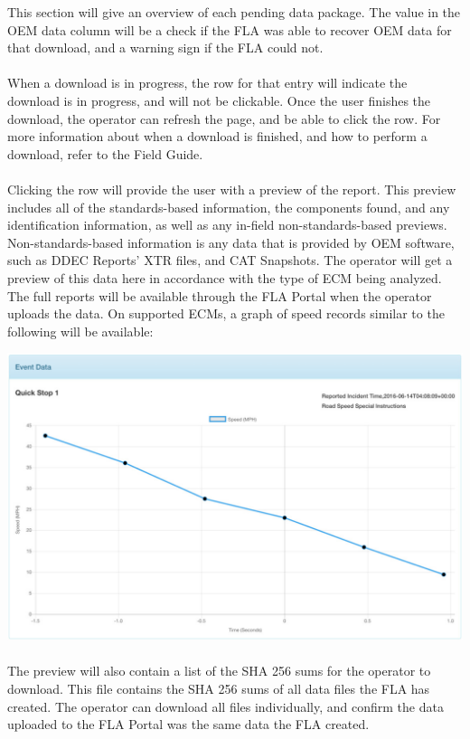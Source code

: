 \documentclass[11pt, oneside]{book}
\begin{document}
This section will give an overview of each pending data package. The value in the
OEM data column will be a check if the FLA was able to recover OEM
data for that download, and a warning sign if the FLA could not.
\paragraph{  }
When a download is in progress, the row for that entry will indicate the download is in progress, and will not be clickable. Once the user finishes the download, the operator can refresh the page, and be able to click the row. For more information about when a download is finished, and how to perform a download, refer to the Field Guide.
\paragraph{  }
Clicking the row will provide the user with a preview of the report. This preview includes all of the standards-based information, the components found, and any identification information, as well as any in-field non-standards-based previews. Non-standards-based information is any data that is provided by OEM software, such as DDEC Reports' XTR files, and CAT Snapshots. The operator will get a preview of this data here in accordance with the type of ECM being analyzed. The full reports will be available through the FLA Portal when the operator uploads the data. On supported ECMs, a graph of speed records similar to the following will be available:
\\[\baselineskip]
\begin{center}
	\includegraphics[width=.9\linewidth]{../media/fla_preview_screenshots/event_graph}
\end{center}

\paragraph{  }
The preview will also contain a list of the SHA 256 sums for the operator
to download. This file contains the SHA 256 sums of all data files
the FLA has created. The operator can download all files individually, and confirm
the data uploaded to the FLA Portal was the same data the FLA created.
\end{document}
